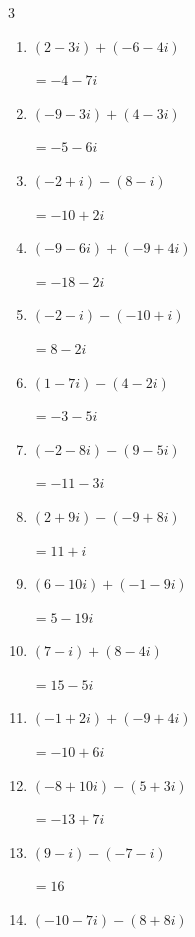 \begin{multicols}{3}
\begin{enumerate}
        $\displaystyle =2+11i$

  \item $\displaystyle (2-3i) + (-6-4i)$

        $\displaystyle =-4-7i$

  \item $\displaystyle (-9-3i) + (4-3i)$

        $\displaystyle =-5-6i$

  \item $\displaystyle (-2+i) - (8-i)$

        $\displaystyle =-10+2i$

  \item $\displaystyle (-9-6i) + (-9+4i)$

        $\displaystyle =-18-2i$

  \item $\displaystyle (-2-i) - (-10+i)$

        $\displaystyle =8-2i$

  \item $\displaystyle (1-7i) - (4-2i)$

        $\displaystyle =-3-5i$

  \item $\displaystyle (-2-8i) - (9-5i)$

        $\displaystyle =-11-3i$

  \item $\displaystyle (2+9i) - (-9+8i)$

        $\displaystyle =11+i$

  \item $\displaystyle (6-10i) + (-1-9i)$

        $\displaystyle =5-19i$

  \item $\displaystyle (7-i) + (8-4i)$

        $\displaystyle =15-5i$

  \item $\displaystyle (-1+2i) + (-9+4i)$

        $\displaystyle =-10+6i$

  \item $\displaystyle (-8+10i) - (5+3i)$

        $\displaystyle =-13+7i$

  \item $\displaystyle (9-i) - (-7-i)$

        $\displaystyle =16$

  \item $\displaystyle (-10-7i) - (8+8i)$


\end{enumerate}
\end{multicols}
